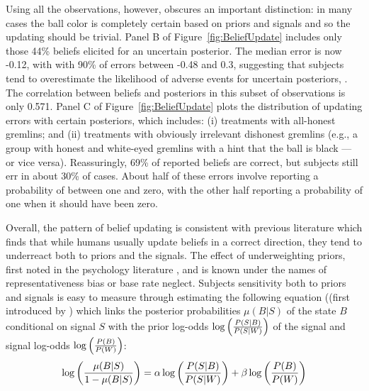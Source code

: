 Using all the observations, however, obscures an important distinction: in many cases the ball color is completely certain based on priors and signals and so the updating should be trivial.  Panel B of Figure~\ref{fig:BeliefUpdate} includes only those 44\% beliefs elicited for an uncertain posterior. The median error is now -0.12, with with 90\% of errors between -0.48 and 0.3, suggesting that subjects tend to overestimate the likelihood of adverse events for uncertain posteriors, . The correlation between beliefs and posteriors in this subset of observations is only 0.571.  Panel C of Figure~\ref{fig:BeliefUpdate} plots the distribution of updating errors with certain posteriors, which includes: (i) treatments with all-honest gremlins; and (ii) treatments with obviously irrelevant dishonest gremlins (e.g., a group with honest and white-eyed gremlins with a hint that the ball is black --- or vice versa). Reassuringly, 69\% of reported beliefs are correct, but subjects still err in about 30\% of cases. About half of these errors involve reporting a probability of between one and zero, with the other half reporting a probability of one when it should have been zero.   

Overall, the pattern of belief updating is consistent with previous literature which finds that while humans usually update beliefs in a correct direction, they tend to underreact both to priors and the signals. The effect of underweighting priors, first noted in the psychology literature \citep*{phillips_conservatism_1966-1, tversky_belief_1971, kahneman_subjective_1972}, and is known under the names of representativeness bias or base rate neglect. Subjects sensitivity both to priors and signals is easy to measure through estimating the following equation ((first introduced by \citet{grether_bayes_1980}) which links the posterior probabilities $\mu(B|S)$ of the state $B$ conditional on signal $S$ with the prior log-odds $\log\left({P(S|B) \over P(S|W)}\right)$ of the signal and signal log-odds $\log \left({P(B)\over P(W)}\right)$: 
\begin{equation}
\log\left({\mu(B|S) \over 1-\mu(B|S)}\right)=\alpha \log\left({P(S|B) \over P(S|W)}\right)+\beta \log \left({P(B)\over P(W)}\right)
\end{equation}


